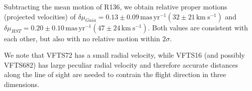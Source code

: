 \documentclass[apjl,twocolumn]{emulateapj}
\newcommand{\kms}{{\,\mathrm{km\ s^{-1}}}}
\newcommand{\masyr}{\,\mathrm{mas}\,\mathrm{yr}^{-1}}
\DeclareRobustCommand{\Figref}[1]{Fig.~\ref{#1}}
\DeclareRobustCommand{\Tabref}[1]{Table~\ref{#1}}
\begin{document}
Subtracting
the mean motion of R136, we obtain relative proper motions (projected
velocities) of $\delta \mu_{Gaia}=0.13\pm 0.09\masyr (32\pm 21\kms)$ and
$\delta \mu_{HST}=0.20\pm 0.10\masyr (47 \pm 24\kms )$. Both values
are consistent with each other, but also with no relative motion
within $2\sigma$.


We note that
VFTS72 has a small radial velocity, while VFTS16 (and possibly VFTS682) has
large peculiar radial velocity and therefore accurate distances along
the line of sight are
needed to contrain the flight direction in three dimensions.
\end{document}
